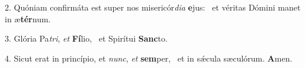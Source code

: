 2. Quóniam confirmáta est super nos misericór\textit{di}\textit{a} \textbf{e}jus: \ast\  et véritas Dómini manet in æ\textbf{tér}num.\

3. Glória Pa\textit{tri}, \textit{et} \textbf{Fí}lio, \ast\  et Spirítui \textbf{Sanc}to.\

4. Sicut erat in princípio, et \textit{nunc}, \textit{et} \textbf{sem}per, \ast\  et in sǽcula sæculórum. \textbf{A}men.\

